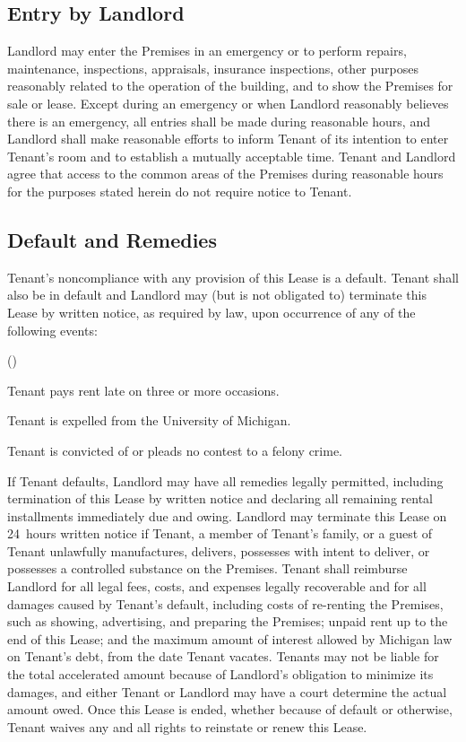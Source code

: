 \documentclass{article}
\begin{document}
\subsection{Entry by Landlord}
Landlord may enter the Premises in an emergency or to perform repairs,
maintenance, inspections, appraisals, insurance inspections, other purposes
reasonably related to the operation of the building, and to show the Premises
for sale or lease. Except during an emergency or when Landlord reasonably
believes there is an emergency, all entries shall be made during reasonable
hours, and Landlord shall make reasonable efforts to inform Tenant of its
intention to enter Tenant’s room and to establish a mutually acceptable time.
Tenant and Landlord agree that access to the common areas of the Premises during
reasonable hours for the purposes stated herein do not require notice to
Tenant.

\subsection{Default and Remedies}\label{Default and Remedies}
Tenant’s noncompliance with any provision of this Lease is a default. Tenant
shall also be in default and Landlord may (but is not obligated to) terminate
this Lease by written notice, as required by law, upon occurrence of any of the
following events:

\begin{compactList}{()}{}
  \item Tenant pays rent late on three or more occasions.
  \item Tenant is expelled from the University of Michigan.
  \item Tenant is convicted of or pleads no contest to a felony crime.
\end{compactList}

If Tenant defaults, Landlord may have all remedies legally permitted, including
termination of this Lease by written notice and declaring all remaining rental
installments immediately due and owing. Landlord may terminate this Lease on
24~hours written notice if Tenant, a member of Tenant’s family, or a guest of
Tenant unlawfully manufactures, delivers, possesses with intent to deliver, or
possesses a controlled substance on the Premises. Tenant shall reimburse
Landlord for all legal fees, costs, and expenses legally recoverable and for all
damages caused by Tenant’s default, including costs of re-renting the Premises,
such as showing, advertising, and preparing the Premises; unpaid rent up to the
end of this Lease; and the maximum amount of interest allowed by Michigan law on
Tenant’s debt, from the date Tenant vacates. Tenants may not be liable for the
total accelerated amount because of Landlord’s obligation to minimize its
damages, and either Tenant or Landlord may have a court determine the actual
amount owed. Once this Lease is ended, whether because of default or otherwise,
Tenant waives any and all rights to reinstate or renew this Lease.
\end{document}

